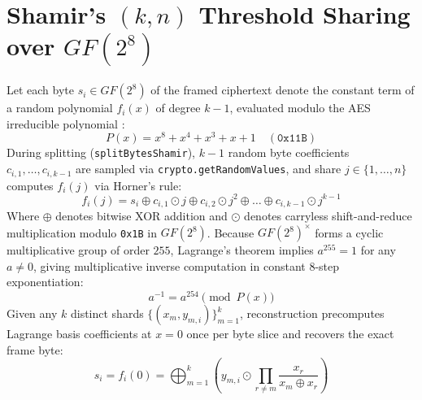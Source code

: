 \documentclass[12pt,a4paper,oneside,openany]{report}
\begin{document}
\section{Shamir's $(k, n)$ Threshold Sharing over $GF(2^8)$}
Let each byte $s_i \in GF(2^8)$ of the framed ciphertext denote the constant term of a random polynomial $f_i(x)$ of degree $k - 1$, evaluated modulo the AES irreducible polynomial \cite{nist_aes}:
\begin{equation}
    P(x) = x^8 + x^4 + x^3 + x + 1 \quad (\texttt{0x11B})
\end{equation}
During splitting (\texttt{splitBytesShamir}), $k-1$ random byte coefficients $c_{i,1}, \dots, c_{i,k-1}$ are sampled via \texttt{crypto.getRandomValues}, and share $j \in \{1, \dots, n\}$ computes $f_i(j)$ via Horner's rule:
\begin{equation}
    f_i(j) = s_i \oplus c_{i,1} \odot j \oplus c_{i,2} \odot j^2 \oplus \dots \oplus c_{i,k-1} \odot j^{k-1}
\end{equation}
Where $\oplus$ denotes bitwise XOR addition and $\odot$ denotes carryless shift-and-reduce multiplication modulo \texttt{0x1B} in $GF(2^8)$. Because $GF(2^8)^\times$ forms a cyclic multiplicative group of order $255$, Lagrange's theorem implies $a^{255} = 1$ for any $a \neq 0$, giving multiplicative inverse computation in constant $8$-step exponentiation:
\begin{equation}
    a^{-1} = a^{254} \pmod{P(x)}
\end{equation}
Given any $k$ distinct shards $\{(x_m, y_{m,i})\}_{m=1}^k$, reconstruction precomputes Lagrange basis coefficients at $x = 0$ once per byte slice and recovers the exact frame byte:
\begin{equation}
    s_i = f_i(0) = \bigoplus_{m=1}^{k} \left( y_{m,i} \odot \prod_{r \ne m} \frac{x_r}{x_m \oplus x_r} \right)
\end{equation}
\end{document}
